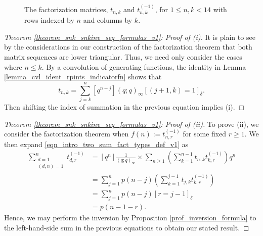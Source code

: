 \documentclass[12pt,reqno,a4letter]{article}
\numberwithin{figure}{section}
\numberwithin{table}{section}
\numberwithin{equation}{section}
\newcommand{\Iverson}[1]{\ensuremath{\left[#1\right]_{\delta}}}
\theoremstyle{plain}
\numberwithin{theorem}{section}
\theoremstyle{definition}
\begin{document}
\begin{figure}[ht!]
\caption[The factorization matrices and their inverses for type I GCD sums]{
	 The factorization matrices, $t_{n,k}$ and $t_{n,k}^{(-1)}$, for 
         $1 \leq n,k < 14$ with rows indexed by $n$ and columns by $k$.} 
\label{figure_lseriesfact_s3nk_tables} 

\end{figure} 

\begin{proof}[Theorem \ref{theorem_snk_snkinv_seq_formulas_v1}: Proof of (i)]  
It is plain to see by the considerations in our construction of the factorization theorem that 
both matrix sequences are lower triangular. Thus, we need only consider the cases where 
$n \leq k$. By a convolution of generating functions, the identity in 
Lemma \ref{lemma_cvl_ident_rpints_indicatorfn} shows that 
\[ 
t_{n,k} = \sum_{j=k}^n [q^{n-j}] (q; q)_{\infty} \Iverson{(j+1, k) = 1}. 
\] 
Then shifting the index of summation in the previous equation implies (i). 
\end{proof} 
\begin{proof}[Theorem \ref{theorem_snk_snkinv_seq_formulas_v1}: Proof of (ii)] 
To prove (ii), we consider the factorization theorem when $f(n) := t_{n,r}^{(-1)}$ for some 
fixed $r \geq 1$. We then expand \eqref{eqn_intro_two_sum_fact_types_def_v1} as 
\begin{align*} 
\sum_{\substack{d=1 \\ (d,n)=1}}^n 
     t_{d,r}^{(-1)} & = [q^n] \frac{1}{(q; q)_{\infty}} \times \sum_{n \geq 1} 
     \left(\sum_{k=1}^{n-1} t_{n,k} t_{k,r}^{(-1)}\right) q^n \\ 
     & = 
     \sum_{j=1}^n p(n-j) \left(\sum_{k=1}^{j-1} t_{j,k} t_{k,r}^{(-1)}\right) \\ 
     & = 
     \sum_{j=1}^n p(n-j) \Iverson{r=j-1} \\ 
     & = 
     p(n-1-r). 
\end{align*} 
Hence, we may perform the inversion by Proposition \ref{prof_inversion_formula} to the 
left-hand-side sum in the previous equations to obtain our stated result. 
\end{proof} 
\end{document}
